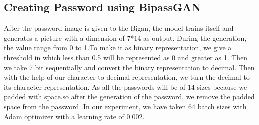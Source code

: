 \documentclass[runningheads]{llncs}
\begin{document}
\subsection{Creating Password using BipassGAN}
After the password image is given to the Bigan, the model trains itself and generates a picture with a dimension of 7*14 as output. During the generation, the value range from 0 to 1.To make it as binary representation, we give a threshold in which less than 0.5 will be represented as 0 and greater as 1. Then we take 7 bit sequentially and convert the binary representation to decimal. Then with the help of our character to decimal representation, we turn the decimal to its character representation. As all the passwords will be of 14 sizes because we padded with space.so after the generation of the password, we remove the padded space from the password. In our experiment, we have taken 64 batch sizes with Adam optimizer with a learning rate of 0.002.
\end{document}
